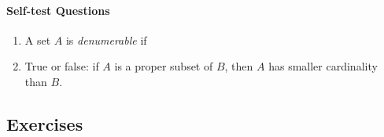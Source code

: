\paragraph{Self-test Questions}

\begin{enumerate}
  \item A set $A$ is \emph{denumerable} if \underline{\phantom{there exists a bijection $f:A\to\N$\qquad\qquad}}
  
  \item True or false: if $A$ is a proper subset of $B$, then $A$ has smaller cardinality than $B$.
\end{enumerate}

\subsection*{Exercises}

